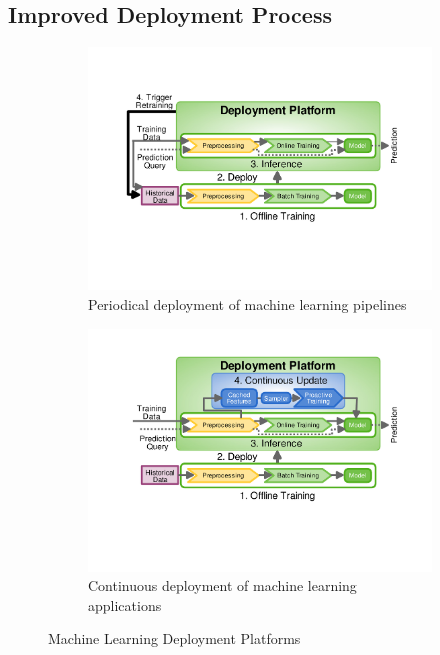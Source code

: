 \subsection{Improved Deployment Process}
\begin{figure}[t]
\begin{subfigure}{\columnwidth}
\centering
\includegraphics[width=\columnwidth]{../images/generic-motivational-example-v2.pdf}
\caption{Periodical deployment of machine learning pipelines}
\label{fig:motivational-example}
\end{subfigure}%
\begin{subfigure}{\columnwidth}
\centering
\includegraphics[width=\columnwidth]{../images/generic-improved-example-v2.pdf}
\caption{Continuous deployment of machine learning applications}
\label{fig:improved-example}
\end{subfigure}
\caption{Machine Learning Deployment Platforms}
\end{figure}

